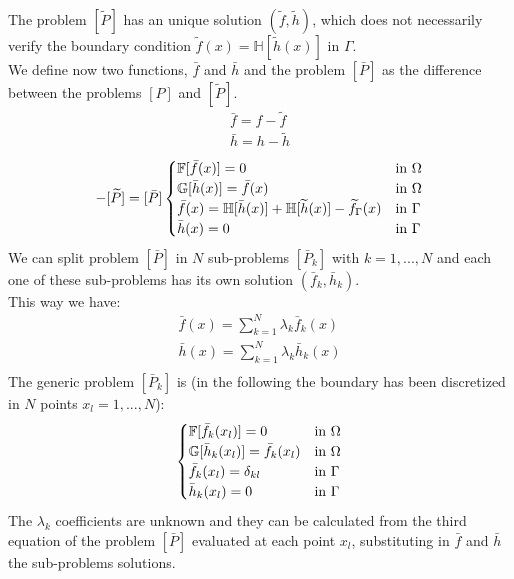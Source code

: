 The problem $[\widetilde{P}]$ has an unique solution $(\widetilde{f},\widetilde{h})$, which does not necessarily verify the boundary condition $\widetilde{f}(x)=\mathbb{H}[\widetilde{h}(x)]$ in $\Gamma$.\\
We define now two functions, $\bar f$ and $\bar h$ and the problem $[\bar P]$ as the difference between the problems $[P]$ and $[\widetilde{P}]$.
\[
\begin{array}{l}
\bar f=f-\widetilde{f}\\[1ex]
\bar h=h-\widetilde{h}
\end{array}
\]
\begin{equation}
[P]-[\widetilde{P}]=[\bar P]
\begin{cases}
\mathbb{F}[\bar f(x)]=0 & \textnormal{in }\Omega\\
\mathbb{G}[\bar h(x)]=\bar f(x) & \textnormal{in }\Omega\\
\bar f(x)=\mathbb{H}[\bar h(x)]+\mathbb{H}[\widetilde{h}(x)]-\widetilde{f}_\Gamma(x)& \textnormal{in }\Gamma\\
\bar h(x)=0 &\textnormal{in }\Gamma\\
\end{cases}
\end{equation}
We can split problem $[\bar P]$ in $N$ sub-problems $[\bar P_k]$ with $k=1,...,N$ and each one of these sub-problems has its own solution $(\bar f_k, \bar h_k)$.\\
This way we have:
\[
\begin{array}{l}
\bar f(x)=\sum\limits_{k=1}^N \lambda_k\bar f_k(x)\\[2ex]
\bar h(x)=\sum\limits_{k=1}^N \lambda_k\bar h_k(x)\\
\end{array}
\]
The generic problem $[\bar P_k]$ is (in the following the boundary has been discretized in $N$ points $x_l=1,...,N$):
\begin{equation}
[\bar P_k]
\begin{cases}
\mathbb{F}[\bar f_k(x_l)]=0 & \textnormal{in }\Omega\\
\mathbb{G}[\bar h_k(x_l)]=\bar f_k(x_l) & \textnormal{in }\Omega\\
\bar f_k(x_l)=\delta_{kl} & \textnormal{in }\Gamma\\
\bar h_k(x_l)=0 &\textnormal{in }\Gamma\\
\end{cases}
\end{equation}
The $\lambda_k$ coefficients are unknown and they can be calculated from the third equation of the problem $[\bar P]$ evaluated at each point $x_l$, substituting in $\bar f$ and $\bar h$ the sub-problems solutions.
